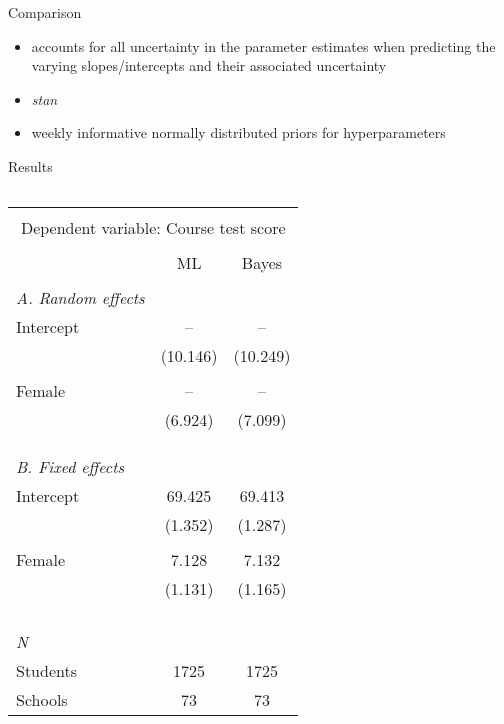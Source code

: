 \begin{frame}{Comparison}
	\Large{
		\begin{itemize}
			\item[]  accounts for all uncertainty in the parameter estimates when predicting the varying slopes/intercepts and their associated uncertainty
			\item[]  \textit{stan}
			\item[]  weekly informative normally distributed priors for hyperparameters

		\end{itemize}
	}
\end{frame}

\begin{frame}{Results}
	\Large{
			\begin{columns}

				\begin{column}{0.7\textwidth}
					\begin{table}
						\footnotesize
						\begin{tabular}{l*{2}{c}}
							\toprule \\[-1.0em]
							\multicolumn{3}{c}{Dependent variable: Course test score}\\ \\[-1.0em]
							&ML &Bayes\\ \midrule \\[-1.0em]
							\emph{A. Random effects} \\
							Intercept & -- & --\\
							& (10.146) & (10.249)\\ \\[-1.0em]
							Female & -- & --\\
							& (6.924) & (7.099)\\ \\[-1.0em]
							\\ \\[-1.0em]\emph{B. Fixed effects} \\
							Intercept & 69.425 & 69.413\\
							& (1.352) & (1.287)\\ \\[-1.0em]
							Female & 7.128 & 7.132\\
							& (1.131) & (1.165)\\ \\[-1.0em]
							\\ \\[-1.0em]\hline \\[-1.0em]
							\emph{N} \\
							\hspace{3mm}Students&1725&1725\\
							\hspace{3mm}Schools&73&73\\
							\bottomrule
						\end{tabular}
					\end{table}
				\end{column}


\end{columns}}
\end{frame}

